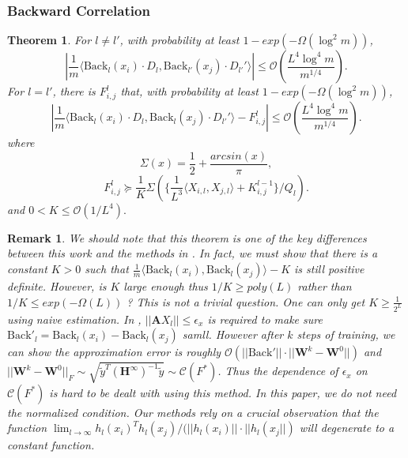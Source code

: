 \documentclass{article}
\newcommand{\cO}{\mathcal{O}}
\newtheorem{theo}{\textbf{Theorem}}
\newtheorem{rem}{\textbf{Remark}}[section]
\begin{document}
\subsubsection{Backward Correlation}\label{f2}
\begin{theo}\label{tt6} For $l\neq l'$, with probability at least $1-exp(-\Omega(\log^2m))$,
\begin{equation}\label{ot}
|\frac{1}{m}\langle \text{Back}_l(x_i)\cdot D_l,\text{Back}_{l'}(x_j)\cdot D_{l'}' \rangle| \leq \cO(\frac{L^4\log^4 m}{m^{1/4}}).
\end{equation}
For $l=l'$, there is $F^l_{i,j}$ that, with probability at least $1-exp(-\Omega(\log^2m))$,
\begin{equation}
|\frac{1}{m}\langle \text{Back}_l(x_i)\cdot D_l,\text{Back}_{l}(x_j)\cdot D_{l'}' \rangle- F^l_{i,j}|\leq \cO(\frac{L^4\log^4 m}{m^{1/4}}).
\end{equation}
where
\begin{equation}
\Sigma(x)=\frac{1}{2}+\frac{arcsin(x)}{\pi},
\end{equation}
\begin{equation}\label{ef}
F^l_{i,j}\succeq \frac{1}{K}\Sigma( \{\frac{1}{L^3}\langle X_{i,l}, X_{j,l} \rangle +K^{l-1}_{i,j}\}/Q_l).
\end{equation}
and $0<K\leq \cO(1/L^4).$
\end{theo}
\begin{rem}
We should note that this theorem is one of the key differences between this work and the methods in \cite{allenzhu2019sgd}. In fact, we must show that there is a constant $K>0$ such that $\frac{1}{m}\langle \text{Back}_l(x_i),\text{Back}_{l}(x_j) \rangle -K $ is still positive definite. However, is $K$ large enough thus $1/K\geq poly(L)$ rather than  $1/K \leq exp(-\Omega(L))$ ? This is not a trivial question. One can only get $K \geq \frac{1}{2^L}$ using naive estimation. In \cite{allenzhu2019sgd},  $||\bm{A}X_l||\leq \epsilon_x$ is required to  make sure $\text{Back}'_l=\text{Back}_l(x_i)-\text{Back}_l(x_j)$ samll. However after $k$ steps of training, we can show the approximation error is roughly $\cO(||\text{Back}'||\cdot ||\bm{W}^k-\bm{W}^0||)$ and $||\bm{W}^k-\bm{W}^0||_F \sim \sqrt{\widetilde{y}^T(\bm{H}^\infty)^{-1}\widetilde{y}} \sim \mathscr{C}(F^*)$. Thus the dependence of $\epsilon_x $ on  $\mathscr{C}(F^*)$ is hard to be dealt with using this method. In this paper, we do not need the normalized condition. Our methods rely on a crucial observation that the function $\lim_{l\to \infty} h_l(x_i)^Th_l(x_j)/(||h_l(x_i)||\cdot||h_l(x_j||)$ will degenerate to a constant function.
\end{rem}
\end{document}
